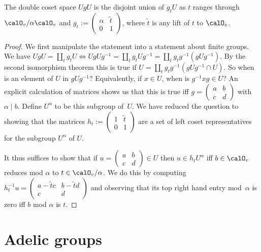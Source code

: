 \begin{lemma}
  \label{bijOn_leftCoset_doubleCoset}
  \leanok
  The double coset space $UgU$ is the disjoint union of $g_tU$ as $t$ ranges
  through $\calO_v/\alpha\calO_v$ and $g_t:=\begin{pmatrix}\alpha&\tilde{t}\\0&1\end{pmatrix}$,
  where $\tilde{t}$ is any lift of $t$ to $\calO_v$.
\end{lemma}
\begin{proof}
  \leanok
  We first manipulate the statement into a statement about finite groups.
  We have $UgU=\coprod_t g_tU\iff UgUg^{-1}=\coprod_t g_tUg^{-1}=\coprod_t g_tg^{-1}(gUg^{-1})$.
  By the second isomorphism theorem this is true if
  $U=\coprod_t g_tg^{-1}(gUg^{-1}\cap U)$. So when is an element of $U$
  in $gUg^{-1}$? Equivalently, if $x\in U$, when is $g^{-1}xg\in U$? An explicit calculation
  of matrices shows us that this is true iff $g=\begin{pmatrix} a&b\\c&d\end{pmatrix}$ with
  $\alpha\mid b$. Define $U^\alpha$ to be this subgroup of~$U$. We have reduced the question
  to showing that the matrices $h_t:=\begin{pmatrix}1&\tilde{t}\\0&1\end{pmatrix}$
  are a set of left coset representatives for the subgroup $U^\alpha$ of $U$.

  It thus suffices to show that if $u=\begin{pmatrix} a&b\\c&d\end{pmatrix}\in U$
  then $u\in h_tU^\alpha$ iff $b\in\calO_v$ reduces mod $\alpha$ to $t\in\calO_v/\alpha$.
  We do this by computing $h_t^{-1}u=\begin{pmatrix} a-\tilde{t}c&b-\tilde{t}d\\c&d\end{pmatrix}$
  and observing that its top right hand entry mod~$\alpha$ is zero iff $b$ mod $\alpha$ is $t$.
\end{proof}

\section{Adelic groups}

